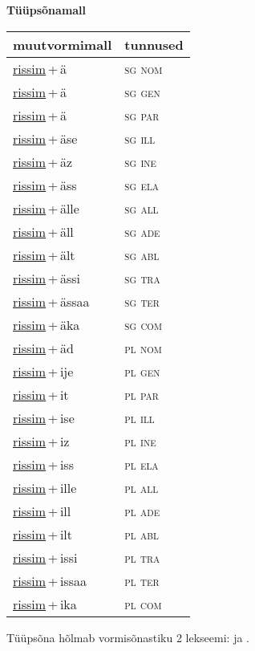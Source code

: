 
\vspace{1.8em}
\begin{minipage}{\textwidth}
\textbf{Tüüpsõnamall \,}\\

\begin{sideways}
\begin{tabular}{l l}
muutvormimall & tunnused \\
\hline
\underline{rissim}\,+\,ä & \textsc{ sg nom } \\
\underline{rissim}\,+\,ä & \textsc{ sg gen } \\
\underline{rissim}\,+\,ä & \textsc{ sg par } \\
\underline{rissim}\,+\,äse & \textsc{ sg ill } \\
\underline{rissim}\,+\,äz & \textsc{ sg ine } \\
\underline{rissim}\,+\,äss & \textsc{ sg ela } \\
\underline{rissim}\,+\,älle & \textsc{ sg all } \\
\underline{rissim}\,+\,äll & \textsc{ sg ade } \\
\underline{rissim}\,+\,ält & \textsc{ sg abl } \\
\underline{rissim}\,+\,ässi & \textsc{ sg tra } \\
\underline{rissim}\,+\,ässaa & \textsc{ sg ter } \\
\underline{rissim}\,+\,äka & \textsc{ sg com } \\
\underline{rissim}\,+\,äd & \textsc{ pl nom } \\
\underline{rissim}\,+\,ije & \textsc{ pl gen } \\
\underline{rissim}\,+\,it & \textsc{ pl par } \\
\underline{rissim}\,+\,ise & \textsc{ pl ill } \\
\underline{rissim}\,+\,iz & \textsc{ pl ine } \\
\underline{rissim}\,+\,iss & \textsc{ pl ela } \\
\underline{rissim}\,+\,ille & \textsc{ pl all } \\
\underline{rissim}\,+\,ill & \textsc{ pl ade } \\
\underline{rissim}\,+\,ilt & \textsc{ pl abl } \\
\underline{rissim}\,+\,issi & \textsc{ pl tra } \\
\underline{rissim}\,+\,issaa & \textsc{ pl ter } \\
\underline{rissim}\,+\,ika & \textsc{ pl com } \\
\end{tabular}
\end{sideways}
\label{tab:tüüpsõnamall-rissimä}

\end{minipage}

 
\vspace{1em}
\noindent Tüüpsõna hõlmab vormisõnastiku 2 lekseemi:  ja .
